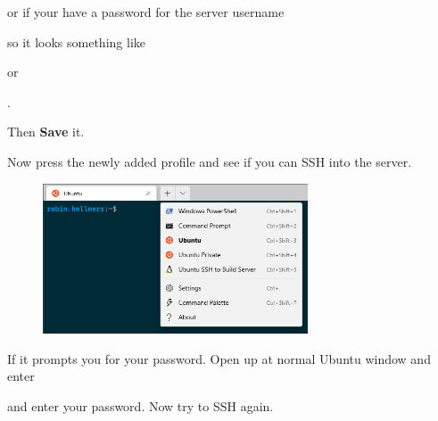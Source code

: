 or if your have a password for the server username


so it looks something like 


or

.

Then \textbf{Save} it.

Now press the newly added profile and see if you can SSH into the server.

\begin{figure}[H]
    \includegraphics[width=0.7\textwidth]{figures/profiles_dropdown.PNG}
\end{figure}

If it prompts you for your password. Open up at normal Ubuntu window and enter


and enter your password. Now try to SSH again.


